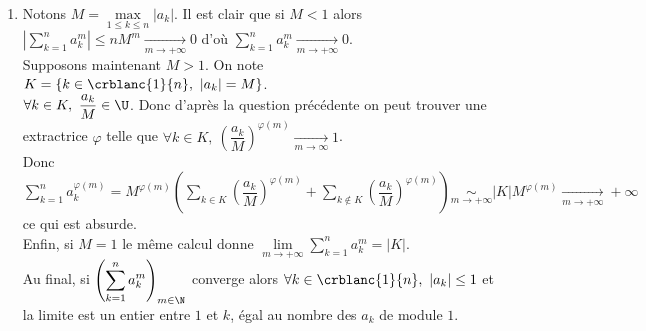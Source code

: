 \documentclass{book}
\begin{document}
\begin{enumerate}
		Par récurrence, pour tout $k\in \crblanc{1}{m}$ $\begin{pmatrix}1\\\vdots\\1\end{pmatrix}$ est une valeur d'adhérence de $\begin{pmatrix}z_1^n\\\vdots\\z_k^n\end{pmatrix}_{n\in \N}$. En particulier $\begin{pmatrix}1\\\vdots\\1\end{pmatrix}$ est une valeur d'adhérence de $\begin{pmatrix}z_1^n\\\vdots\\z_m^n\end{pmatrix}_{n\in \N}$.
		\item Notons $M=\max\limits_{1\leq k\leq n}|a_k|$. Il est clair que si $M<1$ alors $\displaystyle\left|\sum_{k=1}^na_k^m\right|\leq nM^m\underset{m\to+\infty}{\longrightarrow}0$ d'où $\displaystyle\sum_{k=1}^na_k^m\underset{m\to+\infty}{\longrightarrow}0$.\\
		Supposons maintenant $M>1$. On note $K=\{k\in \crblanc{1}{n},\ |a_k|=M\}$.\\
		$\forall k\in K,\ \dfrac{a_k}{M}\in \U$. Donc d'après la question précédente on peut trouver une extractrice $\varphi$ telle que $\forall k\in K,\ \left(\dfrac{a_k}{M}\right)^{\varphi(m)}\underset{m\to\infty}{\longrightarrow}1$.\\
		Donc $\displaystyle\sum_{k=1}^na_k^{\varphi(m)}=M^{\varphi(m)}\left(\sum_{k\in K}\left(\dfrac{a_k}{M}\right)^{\varphi(m)}+\sum_{k\notin K}\left(\dfrac{a_k}{M}\right)^{\varphi(m)}\right)\underset{m\to+\infty}{\sim}|K|M^{\varphi(m)}\underset{m\to+\infty}{\longrightarrow}+\infty$ ce qui est absurde.\\
		Enfin, si $M=1$ le même calcul donne $\underset{m\to+\infty}{\lim}\displaystyle\sum_{k=1}^na_k^m=|K|$.\\
		Au final, si $\left(\displaystyle\sum_{k=1}^na_k^m\right)_{m\in \N}$ converge alors $\forall k\in \crblanc{1}{n},\ |a_k|\leq 1$ et la limite est un entier entre $1$ et $k$, égal au nombre des $a_k$ de module $1$.
	\end{enumerate}
	
\end{document}
